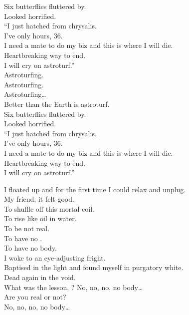 Six butterflies fluttered by. \\
Looked horrified. \\
``I just hatched from chrysalis. \\
I've only hours, 36. \\
I need a mate to do my biz and this is where I will die. \\
Heartbreaking way to end. \\
I will cry on astroturf.'' \\

Astroturfing. \\
Astroturfing. \\
Astroturfing… \\
Better than the Earth is astroturf. \\

Six butterflies fluttered by. \\
Looked horrified. \\
``I just hatched from chrysalis. \\
I've only hours, 36. \\
I need a mate to do my biz and this is where I will die. \\
Heartbreaking way to end. \\
I will cry on astroturf.'' \\




I floated up and for the first time I could relax and unplug. \\
My friend, it felt good. \\

To shuffle off this mortal coil. \\
To rise like oil in water. \\

To be not real. \\
To have no . \\
To have no body. \\

I woke to an eye-adjusting fright. \\
Baptised in the light and found myself in purgatory white. \\
Dead again in the void. \\

What was the lesson, ?
No, no, no, no body… \\
Are you real or not? \\
No, no, no, no body… \\

